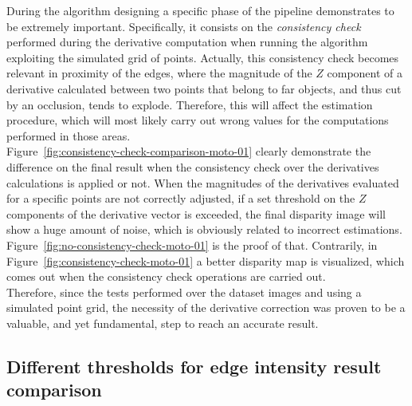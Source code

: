 During the algorithm designing a specific phase of the pipeline demonstrates to be extremely important. 
Specifically, it consists on the \textit{consistency check} performed during the derivative computation when running the algorithm exploiting the simulated grid of points.
Actually, this consistency check becomes relevant in proximity of the edges, where the magnitude of the $Z$ component of a derivative calculated between two points that belong to far objects, and thus cut by an occlusion, tends to explode.
Therefore, this will affect the estimation procedure, which will most likely carry out wrong values for the computations performed in those areas. \\
Figure~\ref{fig:consistency-check-comparison-moto-01} clearly demonstrate the difference on the final result when the consistency check over the derivatives calculations is applied or not.
When the magnitudes of the derivatives evaluated for a specific points are not correctly adjusted, if a set threshold on the $Z$ components of the derivative vector is exceeded, the final disparity image will show a huge amount of noise, which is obviously related to incorrect estimations.
Figure~\ref{fig:no-consistency-check-moto-01} is the proof of that.
Contrarily, in Figure~\ref{fig:consistency-check-moto-01} a better disparity map is visualized, which comes out when the consistency check operations are carried out.\\
Therefore, since the tests performed over the dataset images and using a simulated point grid, the necessity of the derivative correction was proven to be a valuable, and yet fundamental, step to reach an accurate result.

\subsection{Different thresholds for edge intensity result comparison}
\label{subsection:soft-strong-edge-threshold}

